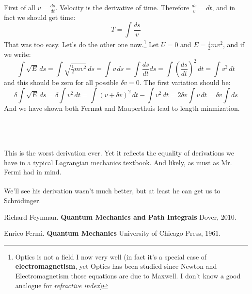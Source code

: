 \documentclass[12pt]{article}
\begin{document}
\newpage

\noindent First of all $v = \frac{ds}{dt}$.  Velocity is the derivative of time.  Therefore $\frac{ds}{v} = dt $, and in fact we should get time:
$$ T = \int \frac{ds}{v} $$
That was too easy.  Let's do the other one now.\footnote{Optics is not a field I now very well (in fact it's a special case of \textbf{electromagnetism}, yet Optics has been studied since Newton and Electromagnetism those equations are due to Maxwell.  I don't know a good analogue for \textit{refractive index})}  Let $U=0$ and $E = \frac{1}{2} m v^2$, and if we write:
$$  \int \sqrt{E} \, ds = \int \sqrt{\tfrac{1}{2}mv^2} \, ds =  \int v \, ds =
\int \frac{ds}{dt} ds = \int \left(\frac{ds}{dt}\right)^2 \, dt  = \int v^2 \, dt $$
and this should be zero for all possible $\delta v = 0$.  The first variation should be:
$$ \delta \int \sqrt{E} \, ds = \delta \int v^2 \, dt
= \int (v + \delta v)^2 \, dt - \int v^2 \, dt  = 2 \delta v \int v \, dt = \delta v \int ds  $$
And we have shown both Fermat and Mauperthuis lead to length minmization.  \\ \\
 \\ \\
This is the worst derivation ever.  Yet it reflects the equality of derivations we have in a typical Lagrangian mechanics textbook.  And likely, as must as Mr. Fermi had in mind.  \\ \\
We'll see his derivation wasn't much better, but at least he can get us to Schr\"{o}dinger.

\vfill

\begin{thebibliography}{}

\item Richard Feynman.  \textbf{Quantum Mechanics and Path Integrals} Dover, 2010.

\item Enrico Fermi.  \textbf{Quantum Mechanics} University of Chicago Press, 1961.

\end{thebibliography}
\end{document}
